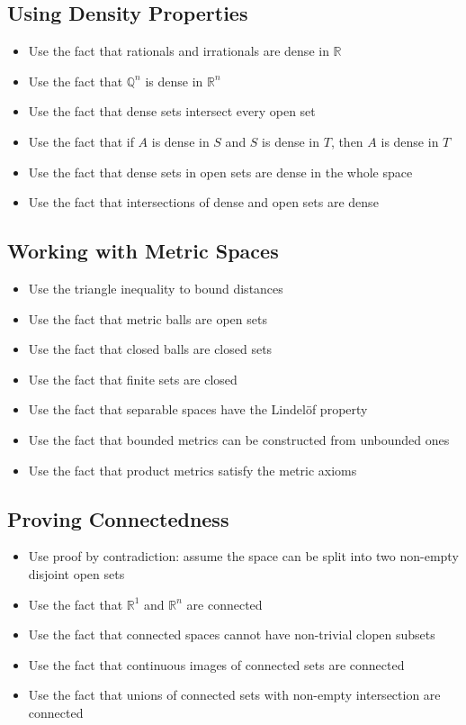 \subsection*{Using Density Properties}
\begin{itemize}
\item Use the fact that rationals and irrationals are dense in $\mathbb{R}$
\item Use the fact that $\mathbb{Q}^n$ is dense in $\mathbb{R}^n$
\item Use the fact that dense sets intersect every open set
\item Use the fact that if $A$ is dense in $S$ and $S$ is dense in $T$, then $A$ is dense in $T$
\item Use the fact that dense sets in open sets are dense in the whole space
\item Use the fact that intersections of dense and open sets are dense
\end{itemize}

\subsection*{Working with Metric Spaces}
\begin{itemize}
\item Use the triangle inequality to bound distances
\item Use the fact that metric balls are open sets
\item Use the fact that closed balls are closed sets
\item Use the fact that finite sets are closed
\item Use the fact that separable spaces have the Lindelöf property
\item Use the fact that bounded metrics can be constructed from unbounded ones
\item Use the fact that product metrics satisfy the metric axioms
\end{itemize}

\subsection*{Proving Connectedness}
\begin{itemize}
\item Use proof by contradiction: assume the space can be split into two non-empty disjoint open sets
\item Use the fact that $\mathbb{R}^1$ and $\mathbb{R}^n$ are connected
\item Use the fact that connected spaces cannot have non-trivial clopen subsets
\item Use the fact that continuous images of connected sets are connected
\item Use the fact that unions of connected sets with non-empty intersection are connected
\end{itemize}

